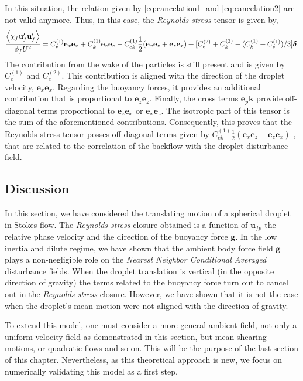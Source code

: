 In this situation, the relation given by \ref{eq:cancelation1} and \ref{eq:cancelation2} are not valid anymore. 
Thus, in this case, the \textit{Reynolds stress} tensor is given by, 
\begin{equation}
    \frac{\left<\chi_f \textbf{u}_f'\textbf{u}_f'\right>}{\phi_f U^2}
    = 
    C^{(1)}_e 
    \textbf{e}_x\textbf{e}_x
    +C^{(1)}_k    
    \textbf{e}_z\textbf{e}_z
    - C^{(1)}_{ek} 
        \frac{1}{2}
        (\textbf{e}_x\textbf{e}_z+ \textbf{e}_z \textbf{e}_x)
    + [C^{(2)}_e + C^{(2)}_k - (C^{(1)}_k + C^{(1)}_e )/3 ]  \bm\delta. 
\end{equation}
The contribution from the wake of the particles is still present and is given by $C_e^{(1)}$ and $C_e^{(2)}$. 
This contribution is aligned with the direction of the droplet velocity, $\textbf{e}_x\textbf{e}_x$. 
Regarding the buoyancy forces, it provides an additional contribution that is proportional to $\textbf{e}_z\textbf{e}_z$. 
Finally, the cross terms $\textbf{e}_p \textbf{k}$ provide off-diagonal terms proportional to $\textbf{e}_z \textbf{e}_x$ or $\textbf{e}_x \textbf{e}_z$. 
The isotropic part of this tensor is the sum of the aforementioned contributions. 
Consequently, this proves that the Reynolds stress tensor posses off diagonal terms given by $C^{(1)}_{ek} 
\frac{1}{2} (\textbf{e}_x\textbf{e}_z+ \textbf{e}_z \textbf{e}_x)$ , that are related to the correlation of the backflow with the droplet disturbance field. 

\subsection{Discussion}

In this section, we have considered the translating motion of a spherical droplet in Stokes flow. 
The \textit{Reynolds stress} closure obtained is a function of $\textbf{u}_{fp}$ the relative phase velocity and the direction of the buoyancy force $\textbf{g}$. 
In the low inertia and dilute regime, we have shown that the ambient body force field $\textbf{g}$ plays a non-negligible role on the \textit{Nearest Neighbor Conditional Averaged} disturbance fields.
When the droplet translation is vertical (in the opposite direction of gravity) the terms related to the buoyancy force turn out to cancel out in the \textit{Reynolds stress} closure.
However, we have shown that it is not the case when the droplet's mean motion were not aligned with the direction of gravity.  

To extend this model, one must consider a more general ambient field, not only a uniform velocity field as demonstrated in this section, but mean shearing motions, or quadratic flows and so on. 
This will be the purpose of the last section of this chapter. 
Nevertheless, as this theoretical approach is new, we focus on numerically validating this model as a first step. 

